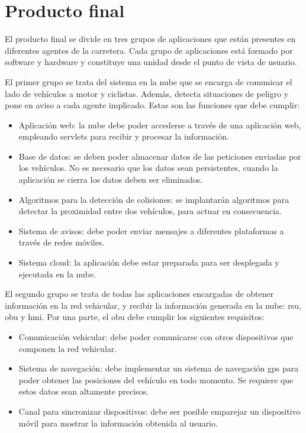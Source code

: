 \chapter{Producto final}
El producto final se divide en tres grupos de aplicaciones que están presentes
en diferentes agentes de la carretera. Cada grupo de aplicaciones está formado
por software y hardware y constituye una unidad desde el punto de vista de
usuario.

El primer grupo se trata del sistema en la nube que se encarga de comunicar el
lado de vehículos a motor y ciclistas. Además, detecta situaciones de peligro y
pone en aviso a cada agente implicado. Estas son las funciones que debe cumplir:
\begin{itemize}
	\item Aplicación web: la nube debe poder accederse a través de una aplicación
	web, empleando servlets para recibir y procesar la información.

	\item Base de datos: se deben poder almacenar datos de las peticiones enviadas
	por los vehículos. No es necesario que los datos sean persistentes, cuando la
	aplicación	se cierra los datos deben ser eliminados.

	\item Algoritmos para la detección de colisiones: se implantarán algoritmos
	para detectar la proximidad entre dos vehículos, para actuar en consecuencia.

	\item Sistema de avisos: debe poder enviar mensajes a diferentes plataformas
	a través de redes móviles.

	\item Sistema cloud: la aplicación debe estar preparada para ser desplegada
	y ejecutada en la nube.
\end{itemize}

El segundo grupo se trata de todas las aplicaciones encargadas de obtener
información en la red vehicular, y recibir la información generada en la nube:
\gls{rsu}, \gls{obu} y \gls{hmi}. Por una parte, el \gls{obu} debe cumplir los
siguientes requisitos:

\begin{itemize}
	\item Comunicación vehicular: debe poder comunicarse con otros dispositivos
	que	componen la red vehicular.

	\item Sistema de navegación: debe implementar un sistema de navegación
	\gls{gps} para poder obtener las posiciones del vehículo en todo momento. Se
	requiere que estos datos sean altamente precisos.

	\item Canal para sincronizar dispositivos: debe ser posible emparejar un
	dispositivo móvil para mostrar la información obtenida al usuario.
\end{itemize}

